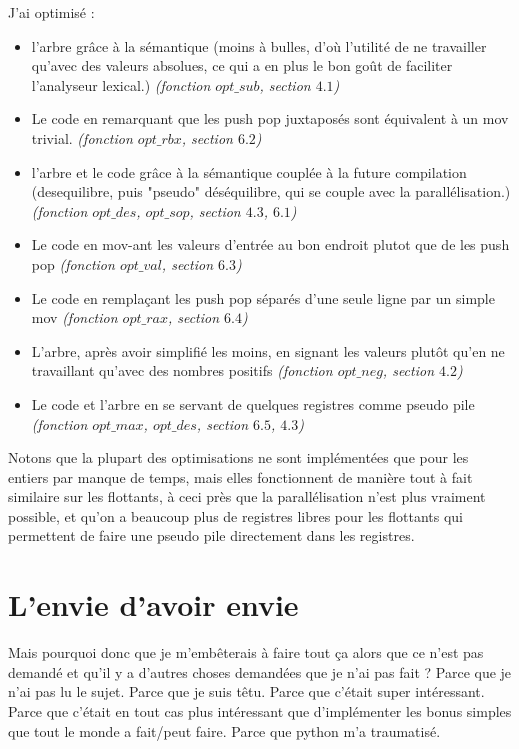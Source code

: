 \documentclass{article}
\begin{document}
J'ai optimisé :\begin{itemize}
\item l'arbre grâce à la sémantique (moins à bulles, d'où l'utilité de ne travailler qu'avec des valeurs absolues, ce qui a en plus le bon goût de faciliter l'analyseur lexical.) {\footnotesize \emph{(fonction $opt\_sub$, section $4.1$)}}
\item Le code en remarquant que les push pop juxtaposés sont équivalent à un mov trivial. {\footnotesize \emph{(fonction $opt\_rbx$, section $6.2$)}}
\item l'arbre  et le code grâce à la sémantique couplée à la future compilation (desequilibre, puis "pseudo" déséquilibre, qui se couple avec la parallélisation.) {\footnotesize \emph{(fonction $opt\_des$, $opt\_sop$, section $4.3$, $6.1$)}}
\item Le code en mov-ant les valeurs d'entrée au bon endroit plutot que de les push pop {\footnotesize \emph{(fonction $opt\_val$, section $6.3$)}}
\item Le code en remplaçant les push pop séparés d'une seule ligne par un simple mov {\footnotesize \emph{(fonction $opt\_rax$, section $6.4$)}}
\item L'arbre, après avoir simplifié les moins, en signant les valeurs plutôt qu'en ne travaillant qu'avec des nombres positifs {\footnotesize \emph{(fonction $opt\_neg$, section $4.2$)}}
\item Le code et l'arbre en se servant de quelques registres comme pseudo pile {\footnotesize \emph{(fonction $opt\_max$, $opt\_des$, section $6.5$, $4.3$)}}
\end{itemize}

Notons que la plupart des optimisations ne sont implémentées que pour les entiers par manque de temps, mais elles fonctionnent de manière tout à fait similaire sur les flottants, à ceci près que la parallélisation n'est plus vraiment possible, et qu'on a beaucoup plus de registres libres pour les flottants qui permettent de faire une pseudo pile directement dans les registres.

\section{L'envie d'avoir envie}
Mais pourquoi donc que je m'embêterais à faire tout ça alors que ce n'est pas demandé et qu'il y a d'autres choses demandées que je n'ai pas fait ?
{\tiny\newline
Parce que je n'ai pas lu le sujet.\newline
Parce que je suis têtu.\newline
Parce que c'était super intéressant.\newline
Parce que c'était en tout cas plus intéressant que d'implémenter les bonus simples que tout le monde a fait/peut faire.\newline
Parce que python m'a traumatisé.}
\end{document}
